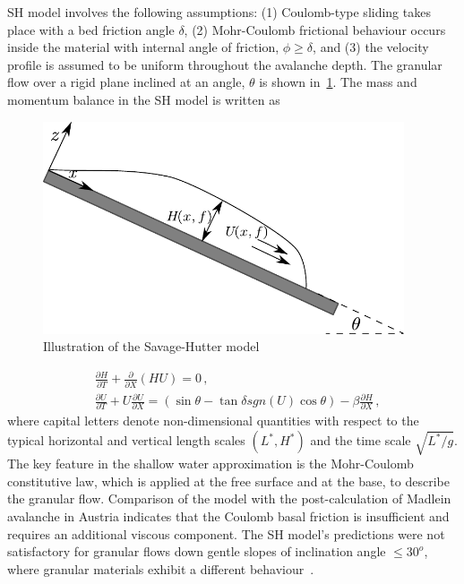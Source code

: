 SH model involves the following assumptions: (1) Coulomb-type sliding takes 
place with a bed friction angle $\delta$, (2) Mohr-Coulomb frictional behaviour 
occurs inside the material with internal angle of friction, $\phi \ge \delta$, 
and (3) the velocity profile is assumed to be uniform throughout the avalanche 
depth. The granular flow over a rigid plane inclined at an angle, $\theta$ is 
shown in~\cref{fig:SH}. The mass and momentum balance in the SH model is 
written as
%
\begin{figure}[htbp]
\centering
\includegraphics[width=0.95\textwidth]{SH}
\caption{Illustration of the Savage-Hutter model}
\label{fig:SH}
\end{figure}
%
\begin{align}
&\frac{\partial \textit{H}}{\partial \textit{T}} + \frac{\partial}{\partial 
\textit{X}} (\textit{HU})  =  0 \,, \\
&\frac{\partial \textit{U}}{\partial \textit{T}} + \textit{U} \frac{\partial 
\textit{U}}{\partial \textit{X}}  = (\sin \theta - \tan \delta 
\textit{sgn}(\textit{U}) \cos \theta) -\beta \frac{\partial 
\textit{H}}{\partial \textit{X}} \,,
\end{align}
%
where capital letters denote non-dimensional quantities with respect to the 
typical horizontal and vertical length scales $(\textit{L}^{*},\textit{H}^{*})$ 
and the time scale $\sqrt{\textit{L}^{*}/\textit{g}}$. The key feature in the 
shallow water approximation is the Mohr-Coulomb constitutive law, which is 
applied at the free surface and at the base, to describe the granular flow. 
Comparison of the model with the post-calculation of Madlein avalanche in 
Austria indicates that the Coulomb basal friction is insufficient and requires 
an additional viscous component. The SH model's predictions were not 
satisfactory for granular flows down gentle slopes of inclination angle $\le 
30^{o}$, where granular materials exhibit a different 
behaviour~\citep{Hutter2005}.

